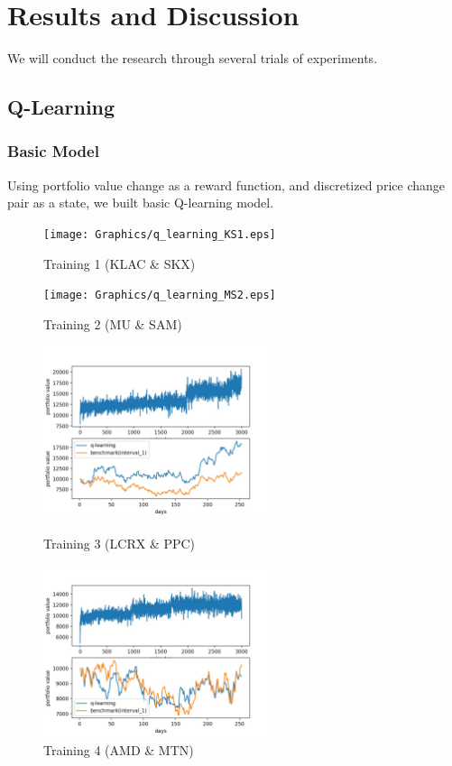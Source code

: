 \chapter{Results and Discussion}
\label{Ch:Result and Discussion}
We will conduct the research through several trials of experiments. 

\section{Q-Learning}

\subsection{Basic Model}
Using portfolio value change as a reward function, and discretized price change pair as a state, we built basic Q-learning model. 
\begin{figure}[H]
\begin{center}
\texttt{[image: Graphics/q\_learning\_KS1.eps]} \caption{Training 1 (KLAC \& SKX)}
\end{center}
\end{figure}

\begin{figure}[H]
\begin{center}
\texttt{[image: Graphics/q\_learning\_MS2.eps]} \caption{Training 2 (MU \& SAM)}
\vspace{0.1cm}
\includegraphics[clip, width=0.6\textwidth]{Graphics/q_learning_LP3.jpg} \caption{Training 3 (LCRX \& PPC)}
\vspace{0.1cm}
\includegraphics[clip, width=0.6\textwidth]{Graphics/q_learning_AM4.jpg} \caption{Training 4 (AMD \& MTN)}
\end{center}
\end{figure}

